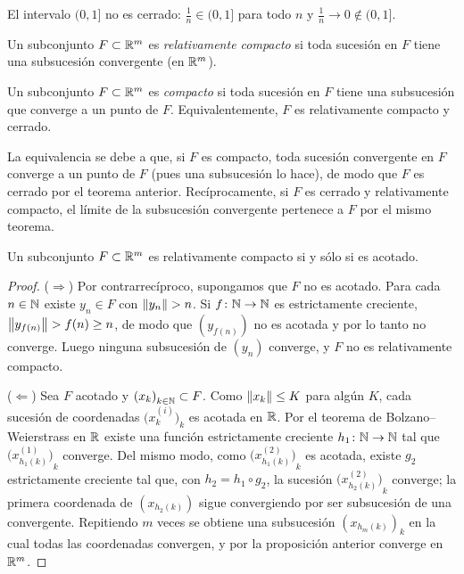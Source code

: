 \begin{eg}
  El intervalo \((0, 1]\) no es cerrado: \(\frac{1}{n} \in (0, 1]\) para todo \(n\) y \(\frac{1}{n} \to 0 \notin (0, 1]\).
\end{eg}

\begin{definition}
  Un subconjunto \(F \subset \mathbb{R}^m\) es \emph{relativamente compacto} si toda sucesión en \(F\) tiene una subsucesión convergente (en \(\mathbb{R}^m\)).
\end{definition}

\begin{definition}[Compacto]
  Un subconjunto \(F \subset \mathbb{R}^m\) es \emph{compacto} si toda sucesión en \(F\) tiene una subsucesión que converge a un punto de \(F\). Equivalentemente, \(F\) es relativamente compacto y cerrado.
\end{definition}

\begin{note}
  La equivalencia se debe a que, si \(F\) es compacto, toda sucesión convergente en \(F\) converge a un punto de \(F\) (pues una subsucesión lo hace), de modo que \(F\) es cerrado por el teorema anterior. Recíprocamente, si \(F\) es cerrado y relativamente compacto, el límite de la subsucesión convergente pertenece a \(F\) por el mismo teorema.
\end{note}

\begin{prop}
  Un subconjunto \(F \subset \mathbb{R}^m\) es relativamente compacto si y sólo si es acotado.
\end{prop}

\begin{proof}
  (\(\Rightarrow\)) Por contrarrecíproco, supongamos que \(F\) no es acotado. Para cada \(n \in \mathbb{N}\) existe \(y_n \in F\) con \(\left\lVert y_n \right\rVert > n\). Si \(f\colon \mathbb{N} \to \mathbb{N}\) es estrictamente creciente, \(\left\lVert y_{f(n)} \right\rVert > f(n) \geq n\), de modo que \({(y_{f(n)})}\) no es acotada y por lo tanto no converge. Luego ninguna subsucesión de \({(y_n)}\) converge, y \(F\) no es relativamente compacto.

  (\(\Leftarrow\)) Sea \(F\) acotado y \({(x_k)}_{k \in \mathbb{N}} \subset F\). Como \(\left\lVert x_k \right\rVert \leq K\) para algún \(K\), cada sucesión de coordenadas \({\bigl( x_k^{(i)} \bigr)}_{k}\) es acotada en \(\mathbb{R}\). Por el teorema de Bolzano--Weierstrass en \(\mathbb{R}\) existe una función estrictamente creciente \(h_1\colon \mathbb{N} \to \mathbb{N}\) tal que \({\bigl( x_{h_1(k)}^{(1)} \bigr)}_{k}\) converge. Del mismo modo, como \({\bigl( x_{h_1(k)}^{(2)} \bigr)}_{k}\) es acotada, existe \(g_2\) estrictamente creciente tal que, con \(h_2 = h_1 \circ g_2\), la sucesión \({\bigl( x_{h_2(k)}^{(2)} \bigr)}_{k}\) converge; la primera coordenada de \({(x_{h_2(k)})}\) sigue convergiendo por ser subsucesión de una convergente. Repitiendo \(m\) veces se obtiene una subsucesión \({(x_{h_m(k)})}_{k}\) en la cual todas las coordenadas convergen, y por la proposición anterior converge en \(\mathbb{R}^m\).
\end{proof}

